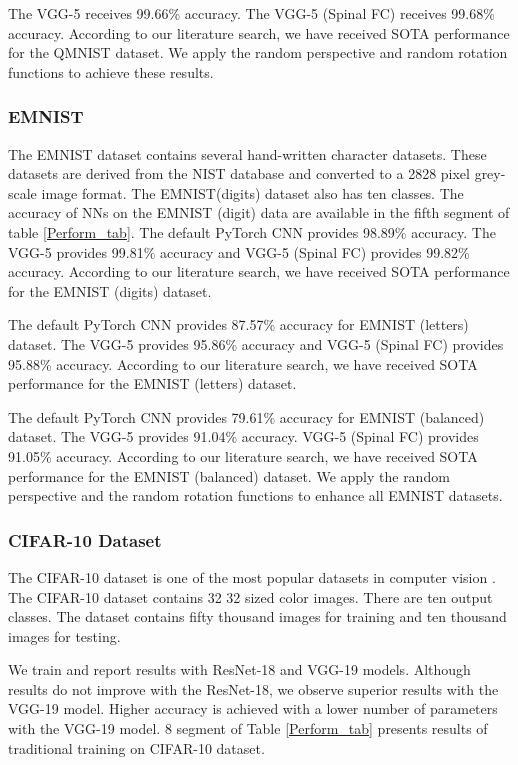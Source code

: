 \documentclass[journal]{IEEEtran}
\begin{document}
The VGG-5 receives 99.66\% accuracy. The VGG-5 (Spinal FC) receives 99.68\% accuracy. According to our literature search, we have received SOTA performance for the QMNIST dataset. We apply the random perspective and random rotation functions to achieve these results.


\subsubsection{EMNIST}
The EMNIST dataset contains several hand-written character datasets. These datasets are derived from the NIST database and converted to a 2828 pixel grey-scale image format. The EMNIST(digits) dataset also has ten classes. The accuracy of NNs on the EMNIST (digit) data are available in the fifth segment of table \ref{Perform_tab}. The default PyTorch CNN provides 98.89\% accuracy. 
The VGG-5 provides 99.81\% accuracy and VGG-5 (Spinal FC) provides 99.82\% accuracy. According to our literature search, we have received SOTA performance for the EMNIST (digits) dataset.

The default PyTorch CNN provides 87.57\% accuracy for EMNIST (letters) dataset. 
The VGG-5 provides 95.86\% accuracy and VGG-5 (Spinal FC) provides 95.88\% accuracy. According to our literature search, we have received SOTA performance for the EMNIST (letters) dataset.

The default PyTorch CNN provides 79.61\% accuracy for EMNIST (balanced) dataset. 
The VGG-5 provides 91.04\% accuracy. VGG-5 (Spinal FC) provides 91.05\% accuracy. According to our literature search, we have received SOTA performance for the EMNIST (balanced) dataset. We apply the random perspective and the random rotation functions to enhance all EMNIST datasets.

\subsubsection{CIFAR-10 Dataset}
The CIFAR-10 dataset is one of the most popular datasets in computer vision \cite{huang2019gpipe}. The CIFAR-10 dataset contains 32  32 sized color images. There are ten output classes. The dataset contains fifty thousand images for training and ten thousand images for testing. 

We train and report results with ResNet-18 \cite{he2016deep} and VGG-19\cite{simonyan2014very} models. Although results do not improve with the ResNet-18, we observe superior results with the VGG-19 model. Higher accuracy is achieved with a lower number of parameters with the VGG-19 model. 8 segment of Table \ref{Perform_tab} presents results of traditional training on CIFAR-10 dataset.
\end{document}
